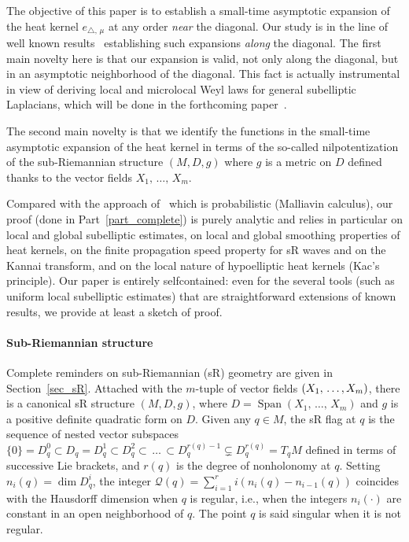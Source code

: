 \documentclass[AHL,Unicode,published]{cedram}
\newcommand{\calQ}{\mathcal{Q}}
\DeclareMathOperator{\Span}{Span}
\begin{document}

The objective of this paper is to establish a small-time asymptotic expansion of the heat kernel $e_{\triangle,\,\mu}$ at any order \emph{near} the diagonal. Our study is in the line of well known results~\cite{BenArous_AIF1989, Metivier1976} establishing such expansions \emph{along} the diagonal. The first main novelty here is that our expansion is valid, not only along the diagonal, but in an asymptotic neighborhood of the diagonal. This fact is actually instrumental in view of deriving local and microlocal Weyl laws for general subelliptic Laplacians, which will be done in the forthcoming paper~\cite{CHT-II}.

The second main novelty is that we identify the functions in the small-time asymptotic expansion of the heat kernel in terms of the so-called nilpotentization of the sub-Riemannian structure $(M,D,g)$ where $g$ is a metric on $D$ defined thanks to the vector fields $X_1,\,\ldots,\,X_m$.

Compared with the approach of~\cite{BenArous_AIF1989} which is probabilistic (Malliavin calculus), our proof (done in Part~\ref{part_complete}) is purely analytic and relies in particular on local and global subelliptic estimates, on local and global smoothing properties of heat kernels, on the finite propagation speed property for sR waves and on the Kannai transform, and on the local nature of hypoelliptic heat kernels (Kac's principle). Our paper is entirely selfcontained: even for the several tools (such as uniform local subelliptic estimates) that are straightforward extensions of known results, we provide at least a sketch of proof.
\goodbreak
\paragraph{Sub-Riemannian structure}
Complete reminders on sub-Riemannian (sR) geometry are given in Section~\ref{sec_sR}. Attached with the $m$-tuple of vector fields $(X_1,\,\ldots,\linebreak X_m)$, there is a canonical sR structure $(M,D,g)$, where $D=\Span(X_1,\,\ldots,\,X_m)$ and $g$ is a positive definite quadratic form on $D$. Given any $q\in M$, the sR flag at $q$ is the sequence of nested vector subspaces $\{0\}=D^0_q\subset D_q=D^1_q\subset D^2_q\subset\,\ldots\,\subset D^{r(q)-1}_q\subsetneq D^{r(q)}_q=T_qM$ defined in terms of successive Lie brackets, and $r(q)$ is the degree of nonholonomy at $q$. Setting $n_i(q) = \dim D^i_q$, the integer $\calQ(q) = \sum_{i=1}^r i (n_i(q)-n_{i-1}(q))$ coincides with the Hausdorff dimension when $q$ is regular, i.e., when the integers $n_i(\cdot)$ are constant in an open neighborhood of $q$. The point $q$ is said singular when it is not regular.
\end{document}
